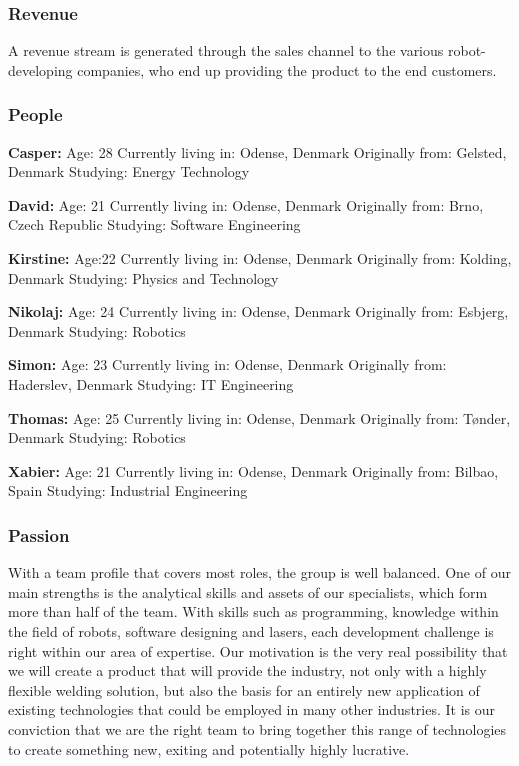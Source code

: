 \subsubsection{Revenue}
A revenue stream is generated through the sales channel to the various robot-developing companies, who end up providing the product to the end customers.   

\subsubsection{People}

\textbf{Casper:}
Age: 28
Currently living in: Odense, Denmark
Originally from: Gelsted, Denmark
Studying: Energy Technology

\textbf{David:}
Age: 21
Currently living in: Odense, Denmark
Originally from: Brno, Czech Republic
Studying: Software Engineering

\textbf{Kirstine:}
Age:22
Currently living in: Odense, Denmark
Originally from: Kolding, Denmark
Studying: Physics and Technology

\textbf{Nikolaj:}
Age: 24
Currently living in: Odense, Denmark
Originally from: Esbjerg, Denmark
Studying: Robotics

\textbf{Simon:}
Age: 23
Currently living in: Odense, Denmark
Originally from: Haderslev, Denmark
Studying: IT Engineering

\textbf{Thomas:}
Age: 25
Currently living in: Odense, Denmark
Originally from: Tønder, Denmark
Studying: Robotics

\textbf{Xabier:}
Age: 21
Currently living in: Odense, Denmark
Originally from: Bilbao, Spain
Studying: Industrial Engineering

\subsubsection{Passion}
With a team profile that covers most roles, the group is well balanced. One of our main strengths is the analytical skills and assets of our specialists, which form more than half of the team.  
With skills such as programming, knowledge within the field of robots, software designing and lasers, each development challenge is right within our area of expertise. 
Our motivation is the very real possibility that we will create a product that will provide the industry, not only with a highly flexible welding solution, but also the basis for an entirely new application of existing technologies that could be employed in many other industries.
It is our conviction that we are the right team to bring together this range of technologies to create something new, exiting and potentially highly lucrative.
